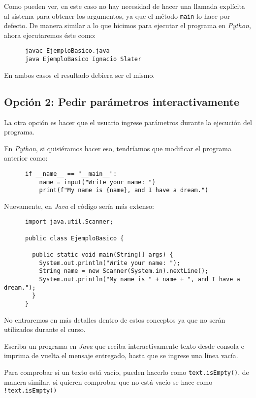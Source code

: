     Como pueden ver, en este caso no hay necesidad de hacer una llamada explícita al 
    sistema para obtener los argumentos, ya que el método \texttt{main} lo hace por 
    defecto.
    De manera similar a lo que hicimos para ejecutar el programa en \textit{Python}, 
    ahora ejecutaremos éste como:

    \begin{verbatim}
      javac EjemploBasico.java
      java EjemploBasico Ignacio Slater
    \end{verbatim}      

    En ambos casos el resultado debiera ser el mismo.

  \subsection{Opción 2: Pedir parámetros interactivamente}
    La otra opción es hacer que el usuario ingrese parámetros durante la ejecución del 
    programa.

    En \textit{Python}, si quisiéramos hacer eso, tendríamos que modificar el programa 
    anterior como:

    \begin{verbatim}
      if __name__ == "__main__":
          name = input("Write your name: ")
          print(f"My name is {name}, and I have a dream.")
    \end{verbatim}

    Nuevamente, en \textit{Java} el código sería más extenso:

    \begin{verbatim}
      import java.util.Scanner;

      public class EjemploBasico {

        public static void main(String[] args) {
          System.out.println("Write your name: ");
          String name = new Scanner(System.in).nextLine();
          System.out.println("My name is " + name + ", and I have a dream.");
        }
      }
    \end{verbatim}

    No entraremos en más detalles dentro de estos conceptos ya que no serán utilizados 
    durante el curso.

    \begin{exercise}
      Escriba un programa en \textit{Java} que reciba interactivamente texto desde consola
      e imprima de vuelta el mensaje entregado, hasta que se ingrese una línea vacía.
      
      Para comprobar si un texto está vacío, pueden hacerlo como 
      \texttt{text.isEmpty()}, de manera similar, si quieren comprobar que no 
      está vacío se hace como \texttt{!text.isEmpty()}
    \end{exercise}
%